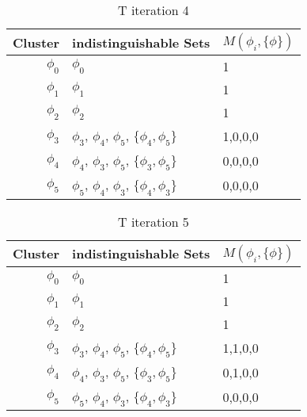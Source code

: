 \documentclass{article}
\begin{document}
				\begin{table}[h!]
				  \begin{center}
				    \caption{T iteration 4}
				    \label{tab:table6}
				    \begin{tabular}{r|l|l}
				      Cluster & indistinguishable Sets & $M(\phi_i, \{\phi\})$\\
				      \hline
				      $\phi_0$ & $\phi_0$ & 1\\
				      $\phi_1$ & $\phi_1$ & 1\\
				      $\phi_2$ & $\phi_2$ & 1\\
				      $\phi_3$ & $\phi_3$, $\phi_4$, $\phi_5$, $\{\phi_4,\phi_5\}$ & 1,0,0,0\\
				      $\phi_4$ & $\phi_4$, $\phi_3$, $\phi_5$, $\{\phi_3,\phi_5\}$ & 0,0,0,0\\
				      $\phi_5$ & $\phi_5$, $\phi_4$, $\phi_3$, $\{\phi_4,\phi_3\}$ & 0,0,0,0\\
				    \end{tabular}
				  \end{center}
				\end{table}

				\begin{table}[h!]
				  \begin{center}
				    \caption{T iteration 5}
				    \label{tab:table7}
				    \begin{tabular}{r|l|l}
				      Cluster & indistinguishable Sets & $M(\phi_i, \{\phi\})$\\
				      \hline
				      $\phi_0$ & $\phi_0$ & 1\\
				      $\phi_1$ & $\phi_1$ & 1\\
				      $\phi_2$ & $\phi_2$ & 1\\
				      $\phi_3$ & $\phi_3$, $\phi_4$, $\phi_5$, $\{\phi_4,\phi_5\}$ & 1,1,0,0\\
				      $\phi_4$ & $\phi_4$, $\phi_3$, $\phi_5$, $\{\phi_3,\phi_5\}$ & 0,1,0,0\\
				      $\phi_5$ & $\phi_5$, $\phi_4$, $\phi_3$, $\{\phi_4,\phi_3\}$ & 0,0,0,0\\
				    \end{tabular}
				  \end{center}
				\end{table}
\end{document}
